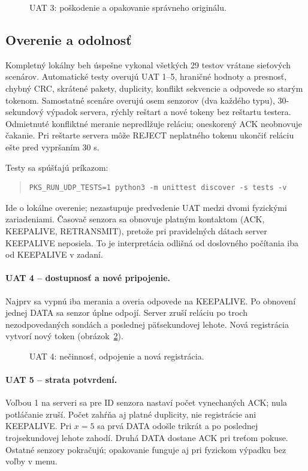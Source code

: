 \documentclass[12pt,a4paper]{article}
\begin{document}
\begin{figure}[!htbp]
\centering

\caption{UAT 3: poškodenie a opakovanie správneho originálu.}
\label{fig:uat3}
\end{figure}

\subsection{Overenie a odolnosť}

Kompletný lokálny beh úspešne vykonal všetkých 29 testov vrátane sieťových scenárov. Automatické testy overujú UAT 1--5, hraničné hodnoty a presnosť, chybný CRC, skrátené pakety, duplicity, konflikt sekvencie a odpovede so starým tokenom. Samostatné scenáre overujú osem senzorov (dva každého typu), 30-sekundový výpadok servera, rýchly reštart a nové tokeny bez reštartu testera. Odmietnuté konfliktné meranie nepredlžuje reláciu; oneskorený ACK neobnovuje čakanie. Pri reštarte servera môže REJECT neplatného tokenu ukončiť reláciu ešte pred vypršaním 30 s.

Testy sa spúšťajú príkazom:
\begin{quote}\small\singlespacing
\begin{verbatim}
PKS_RUN_UDP_TESTS=1 python3 -m unittest discover -s tests -v
\end{verbatim}
\end{quote}
Ide o lokálne overenie; nezastupuje predvedenie UAT medzi dvomi fyzickými zariadeniami. Časovač senzora sa obnovuje platným kontaktom (ACK, KEEPALIVE, RETRANSMIT), pretože pri pravidelných dátach server KEEPALIVE neposiela. To je interpretácia odlišná od doslovného počítania iba od KEEPALIVE v zadaní.

\clearpage
\paragraph{UAT 4 -- dostupnosť a nové pripojenie.}
Najprv sa vypnú iba merania a overia odpovede na KEEPALIVE. Po obnovení jednej DATA sa senzor úplne odpojí. Server zruší reláciu po troch nezodpovedaných sondách a poslednej päťsekundovej lehote. Nová registrácia vytvorí nový token (obrázok~\ref{fig:uat4}).

\begin{figure}[!htbp]
\centering

\caption{UAT 4: nečinnosť, odpojenie a nová registrácia.}
\label{fig:uat4}
\end{figure}

\clearpage
\paragraph{UAT 5 -- strata potvrdení.}
Voľbou 1 na serveri sa pre ID senzora nastaví počet vynechaných ACK; nula potláčanie zruší. Počet zahŕňa aj platné duplicity, nie registrácie ani KEEPALIVE. Pri $x=5$ sa prvá DATA odošle trikrát a po poslednej trojsekundovej lehote zahodí. Druhá DATA dostane ACK pri treťom pokuse. Ostatné senzory pokračujú; opakovanie funguje aj pri fyzickom výpadku bez voľby v menu.
\end{document}
